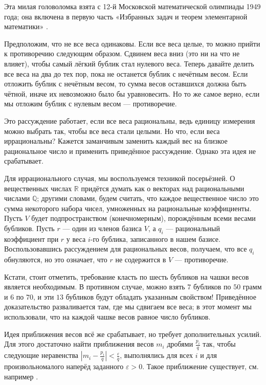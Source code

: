 Эта милая головоломка взята с 12-й Московской математической олимпиады 1949 года;
она включена в первую часть «Избранных задач и теорем элементарной математики» %
\cite[задача 127, стр. 28]{shklarsky-chentzov-yaglom}.

Предположим, что не все веса одинаковы.
Если все веса целые, то можно прийти к противоречию следующим образом.
Сдвинем веса вниз (это ни на что не влияет), чтобы самый лёгкий бублик стал нулевого веса.
Теперь давайте делить все веса на два до тех пор, пока не останется бублик с нечётным весом.
Если отложить бублик с нечётным весом, то сумма весов оставшихся должна быть чётной, иначе их невозможно было бы уравновесить.
Но то же самое верно, если мы отложим бублик с нулевым весом --- противоречие.

Это рассуждение работает, если все веса рациональны, ведь единицу измерения можно выбрать так, чтобы все веса стали целыми.
Но что, если веса иррациональны?
Кажется заманчивым заменить каждый вес на близкое рациональное число и применить приведённое рассуждение.
Однако эта идея не срабатывает.

Для иррационального случая, мы воспользуемся техникой посерьёзней.
О вещественных числах $\mathbb{R}$ придётся думать как о векторах над рациональными числами $\mathbb{Q}$;
другими словами, будем считать, что каждое вещественное число это сумма некоторого набора чисел, умноженных на рациональные коэффициенты.
Пусть $V$ будет подпространством (конечномерным), порождённым всеми весами бубликов.
Пусть $r$ --- один из членов базиса $V$, а $q_i$ --- рациональный коэффициент при $r$ у веса $i$-го бублика, записанного в нашем базисе.
Воспользовавшись рассуждением для рациональных весов, получаем, что все $q_i$ обнуляются, но это означает, что $r$ не содержится в $V$ --- противоречие.

Кстати, стоит отметить, требование класть по шесть бубликов на чашки весов является необходимым.
В противном случае, можно взять $7$ бубликов по $50$ грамм и $6$ по $70$, и эти $13$ бубликов будут обладать указанным свойством!
Приведённое доказательство разваливается там, где мы сдвигаем все веса;
в этот момент мы использовали, что на каждой чашке весов равное число бубликов.

\begin{addedbytheeditors}
Идея приближения весов всё же срабатывает, но требует дополнительных усилий.
Для этого достаточно найти приближения весов $m_i$ дробями $\tfrac{p_i}q$ так, чтобы следующие неравенства
$|m_i-\tfrac{p_i}q|<\tfrac\varepsilon q$,
выполнялись для всех $i$ и для произвольномалого наперёд заданного $\varepsilon>0$.
Такое приближение существует, см. например \cite[Lemma 1]{benko}.
\end{addedbytheeditors}


